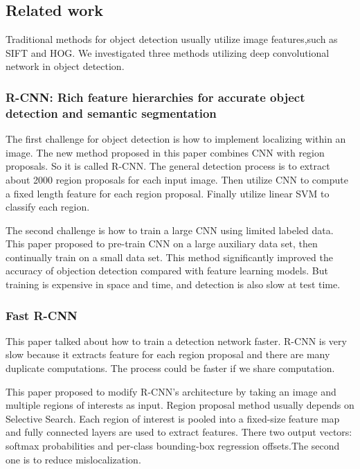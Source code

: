 
\subsection{Related work}
\label{others}
Traditional methods for object detection usually utilize image features,such as SIFT and HOG. We investigated three methods utilizing deep convolutional network in object detection.
\subsubsection{R-CNN: Rich feature hierarchies for accurate object detection and semantic segmentation}

 The first challenge for object detection is how to implement localizing within an image. The new method proposed in this paper\cite {rcnn} combines CNN with region proposals. So it is called R-CNN. The general detection process is to extract about 2000 region proposals for each input image. Then utilize CNN to compute a fixed length feature for each region proposal. Finally utilize linear SVM to classify each region. 


The second challenge is how to train a large CNN using limited labeled data. This paper proposed to pre-train CNN on a large auxiliary data set, then continually train on a small data set. This method significantly improved the accuracy of objection detection compared with feature learning models. But training is expensive in space and time, and detection is also slow at test time.

\subsubsection{Fast R-CNN}
This paper\cite {fast-rcnn} talked about how to train a detection network faster. R-CNN is very slow because it extracts feature for each region proposal and there are many duplicate computations. The process could be faster if we share computation. 

This paper proposed to modify R-CNN’s architecture by taking an image and multiple regions of interests as input. Region proposal method usually depends on Selective Search. Each region of interest is pooled into a fixed-size feature map and fully connected layers are used to extract features. There two output vectors: softmax probabilities and per-class bounding-box regression offsets.The second one is to reduce mislocalization.




